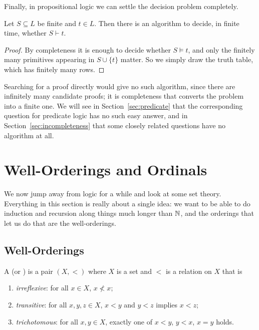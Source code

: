 \documentclass[a4paper]{scrartcl}
\begin{document}
Finally, in propositional logic we can settle the decision problem completely.

\begin{theorem}[Decidability]
  Let $S \subseteq L$ be finite and $t \in L$. Then there is an algorithm to decide, in finite time, whether $S \vdash t$.
\end{theorem}
\begin{proof}
  By completeness it is enough to decide whether $S \models t$, and only the finitely many primitives appearing in $S \cup \{t\}$ matter. So we simply draw the truth table, which has finitely many rows.
\end{proof}

Searching for a proof directly would give no such algorithm, since there are infinitely many candidate proofs; it is completeness that converts the problem into a finite one. We will see in Section~\ref{sec:predicate} that the corresponding question for predicate logic has no such easy answer, and in Section~\ref{sec:incompleteness} that some closely related questions have no algorithm at all.

\section{Well-Orderings and Ordinals}

We now jump away from logic for a while and look at some set theory. Everything in this section is really about a single idea: we want to be able to do induction and recursion along things much longer than $\mathbb{N}$, and the orderings that let us do that are the well-orderings.

\subsection{Well-Orderings}

\begin{definition}
  A  (or ) is a pair $(X, <)$ where $X$ is a set and $<$ is a relation on $X$ that is
  \begin{enumerate}[label=(\roman*)]
    \item \emph{irreflexive}: for all $x \in X$, $x \not< x$;
    \item \emph{transitive}: for all $x, y, z \in X$, $x < y$ and $y < z$ implies $x < z$;
    \item \emph{trichotomous}: for all $x, y \in X$, exactly one of $x < y$, $y < x$, $x = y$ holds.
  \end{enumerate}
\end{definition}
\end{document}
